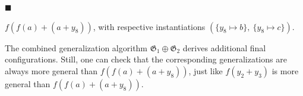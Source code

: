  
 
\par\noindent  $\blacksquare$ 
 
$f(f(a)+(a+y_{8}))$, with respective instantiations $(\{y_{8}\mapsto b\},\ \{y_{8}\mapsto c\})$.\par
 
 
  
 
 
The combined generalization algorithm $\mathfrak{G}_{1}\oplus\mathfrak{G}_{2}$ derives additional final configurations. Still, one can check that the corresponding generalizations are always more general than $f(f(a)+(a+y_{8}))$, just like $f(y_{2}+y_{3})$ is more general than $f(f(a)+(a+y_{8}))$.\par
 
 
 
 
